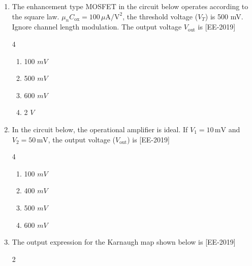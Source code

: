 \documentclass[journal]{IEEEtran}
\begin{document}
\begin{enumerate}
\begin{multicols}{4}
\begin{enumerate}
    \item  $9 \, \Omega$
    \item  $99 \, \Omega$
    \item  $990 \, \Omega$
    \item  $9990 \, \Omega$
\end{enumerate}
\end{multicols}


\item The enhancement type MOSFET in the circuit below operates according to the square law. $\mu_n C_{\text{ox}} = 100 \, \mu \text{A}/\text{V}^2$, the threshold voltage ($V_T$) is 500 mV. Ignore channel length modulation. The output voltage $V_{\text{out}}$ is \hfill{[EE-2019]}
\begin{figure}[H]
\centering

\end{figure}
\begin{multicols}{4}
    


\begin{enumerate}
    \item  100 $mV$
    \item  500 $mV$
    \item  600 $mV$
    \item  2 $V$
\end{enumerate}
\end{multicols}
\item In the circuit below, the operational amplifier is ideal. If $V_1 = 10 \, \text{mV}$ and $V_2 = 50 \, \text{mV}$, the output voltage ($V_{\text{out}}$) is \hfill{[EE-2019]}
\begin{figure}[H]
\centering

\end{figure}
\begin{multicols}{4}
    


\begin{enumerate}
    \item  100 $mV$
    \item  400 $mV$
    \item  500 $mV$
    \item  600 $mV$
\end{enumerate}
\end{multicols}



    \item The output expression for the Karnaugh map shown below is \hfill{[EE-2019]}
    \begin{figure}[H]
\centering

\end{figure}
\begin{multicols}{2}
    


\end{multicols}
\end{enumerate}
\end{document}
